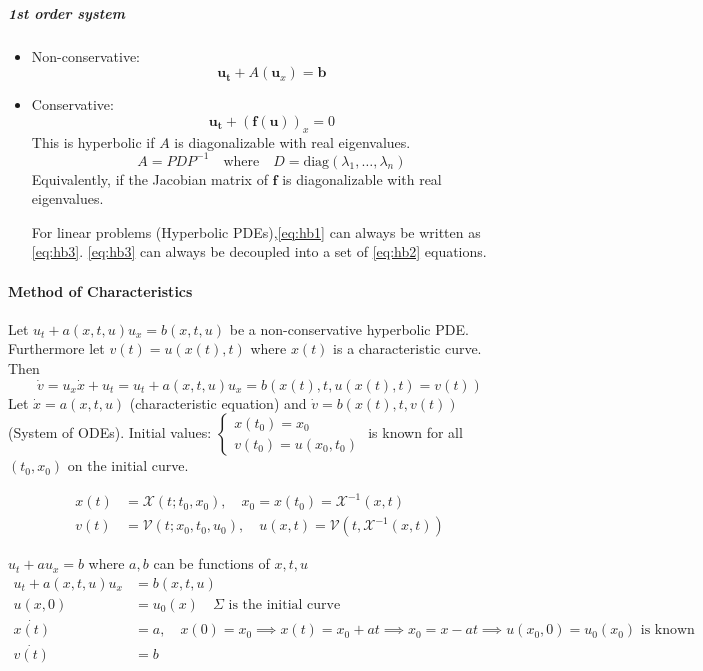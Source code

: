 \subparagraph{1st order system}
\begin{itemize}
  \item Non-conservative: \[\symbf{u_t} + A(\symbf{u}_x) = \symbf{b}\tag{3}\]\label{eq:hb3}
  \item Conservative: \[\symbf{u_t} + (\symbf{f}(\symbf{u}))_x = 0\]
        This is hyperbolic if \(A\) is diagonalizable with real eigenvalues.
        \[
          A = PDP^{-1} \quad \text{where} \quad D = \text{diag}(\lambda_1, \ldots, \lambda_n)
        \]
        Equivalently, if the Jacobian matrix of \(\symbf{f}\) is diagonalizable with real eigenvalues.

        For linear problems (Hyperbolic PDEs),\eqref{eq:hb1} can always be written as \eqref{eq:hb3}.
        \eqref{eq:hb3} can always be decoupled into a set of \eqref{eq:hb2} equations.
\end{itemize}
\paragraph{Method of Characteristics}
Let \(u_t + a(x,t,u)u_x = b(x,t,u)\) be a non-conservative hyperbolic PDE. Furthermore let \(v(t) = u(x(t), t)\) where \(x(t)\) is a characteristic curve. Then
\[
  \dot{v} = u_x \dot{x} + u_t = u_t + a(x,t,u)u_x = b(x(t), t, u(x(t), t)=v(t))
\]
Let \(\dot{x} = a(x,t,u)\) (characteristic equation) and \(\dot{v} = b(x(t), t, v(t))\) (System of ODEs).
Initial values: \(\begin{cases} x(t_0) = x_0 \\ v(t_0) = u(x_0, t_0) \end{cases}\) is known for all \((t_0, x_0)\) on the initial curve.

\begin{align*}
  x(t) & = \mathcal{X}(t; t_0, x_0), \quad x_0 = x(t_0) = \mathcal{X}^{-1}(x, t)               \\
  v(t) & = \mathcal{V}(t; x_0, t_0, u_0), \quad u(x,t) = \mathcal{V}(t, \mathcal{X}^{-1}(x,t))
\end{align*}

\begin{example}{\(u_t + a u_x = b\) where \(a, b\) can be functions of \(x, t, u\)}{}
  \begin{align*}
    u_t + a(x,t,u)u_x & = b(x,t,u)                                                                                                          \\
    u(x,0)            & = u_0(x)   \quad \Sigma \text{ is the initial curve}                                                                \\
    \dot{x(t)}        & = a, \quad x(0) = x_0 \implies x(t) = x_0 + at \implies x_0 = x - at \implies u(x_0, 0) = u_0(x_0) \text{ is known} \\
    \dot{v(t)}        & = b
  \end{align*}


\end{example}


